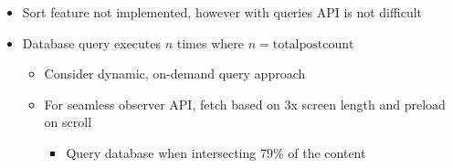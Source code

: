 \documentclass[7px]{article}
\begin{document}
{
  \raggedright
  \begin{itemize}[label=\blitzb]
    \small
    \item Sort feature not implemented, however with queries API is not difficult
    \item Database query executes $n$ times where $n = \text{total}$\hspace{0.7mm}$\text{post}$\hspace{0.7mm}$\text{count}$
      \footnotesize
      \begin{itemize}[label=$\multimapinv$]
        \item Consider dynamic, on-demand query approach
        \item For seamless {\cap} observer API, fetch based on 3x screen length and preload on scroll
      \begin{itemize}[label=$\multimapinv$]
        \item Query database when intersecting 79\% of the content
    \end{itemize}
      \end{itemize}
      \small
  \end{itemize}
}
\end{document}
